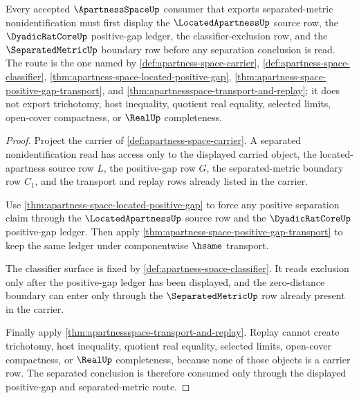 \begin{theorem}
\label{thm:apartnessspace-scoped-separated-positive-gap-route}
Every accepted $\ApartnessSpaceUp$ consumer that exports separated-metric
nonidentification must first display the $\LocatedApartnessUp$ source row, the
$\DyadicRatCoreUp$ positive-gap ledger, the classifier-exclusion row, and the
$\SeparatedMetricUp$ boundary row before any separation conclusion is read.
The route is the one named by \autoref{def:apartness-space-carrier},
\autoref{def:apartness-space-classifier},
\autoref{thm:apartness-space-located-positive-gap},
\autoref{thm:apartness-space-positive-gap-transport}, and
\autoref{thm:apartnessspace-transport-and-replay}; it does not export
trichotomy, host inequality, quotient real equality, selected limits,
open-cover compactness, or $\RealUp$ completeness.
\end{theorem}
\begin{proof}
Project the carrier of \autoref{def:apartness-space-carrier}. A separated
nonidentification read has access only to the displayed carried object, the
located-apartness source row $L$, the positive-gap row $G$, the
separated-metric boundary row $C_1$, and the transport and replay rows already
listed in the carrier.

Use \autoref{thm:apartness-space-located-positive-gap} to force any positive
separation claim through the $\LocatedApartnessUp$ source row and the
$\DyadicRatCoreUp$ positive-gap ledger. Then apply
\autoref{thm:apartness-space-positive-gap-transport} to keep the same ledger
under componentwise $\hsame$ transport.

The classifier surface is fixed by \autoref{def:apartness-space-classifier}.
It reads exclusion only after the positive-gap ledger has been displayed, and
the zero-distance boundary can enter only through the $\SeparatedMetricUp$ row
already present in the carrier.

Finally apply \autoref{thm:apartnessspace-transport-and-replay}. Replay cannot
create trichotomy, host inequality, quotient real equality, selected limits,
open-cover compactness, or $\RealUp$ completeness, because none of those
objects is a carrier row. The separated conclusion is therefore consumed only
through the displayed positive-gap and separated-metric route.
\end{proof}

